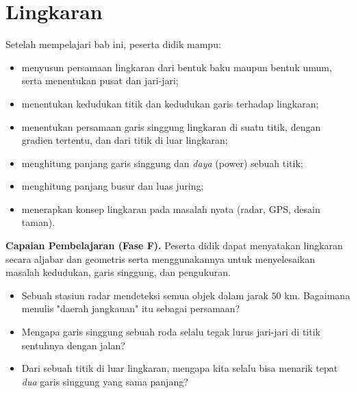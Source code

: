 \documentclass[11pt,a4paper]{report}
\theoremstyle{gaya}
\begin{document}
\chapter{Lingkaran}
\begin{tujuan}
Setelah mempelajari bab ini, peserta didik mampu:
\begin{itemize}[leftmargin=*,topsep=2pt]
  \item menyusun persamaan lingkaran dari bentuk baku maupun bentuk umum, serta menentukan pusat dan jari-jari;
  \item menentukan kedudukan titik dan kedudukan garis terhadap lingkaran;
  \item menentukan persamaan garis singgung lingkaran di suatu titik, dengan gradien tertentu, dan dari titik di luar lingkaran;
  \item menghitung panjang garis singgung dan \emph{daya} (power) sebuah titik;
  \item menghitung panjang busur dan luas juring;
  \item menerapkan konsep lingkaran pada masalah nyata (radar, GPS, desain taman).
\end{itemize}
\textbf{Capaian Pembelajaran (Fase F).} Peserta didik dapat menyatakan lingkaran secara aljabar dan geometris serta menggunakannya untuk menyelesaikan masalah kedudukan, garis singgung, dan pengukuran.
\end{tujuan}

\begin{pemantik}
\begin{itemize}[leftmargin=*,topsep=2pt]
  \item Sebuah stasiun radar mendeteksi semua objek dalam jarak $50$ km. Bagaimana menulis "daerah jangkauan" itu sebagai persamaan?
  \item Mengapa garis singgung sebuah roda selalu tegak lurus jari-jari di titik sentuhnya dengan jalan?
  \item Dari sebuah titik di luar lingkaran, mengapa kita selalu bisa menarik tepat \emph{dua} garis singgung yang sama panjang?
\end{itemize}
\end{pemantik}
\end{document}

